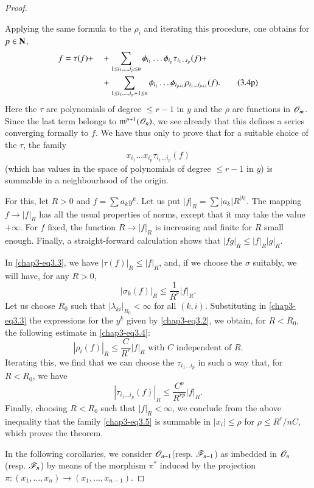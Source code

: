 \begin{proof}
\begin{itemize}
Applying the same formula to the $\rho_{i}$ and iterating this procedure, one obtains for $p\in \mathbf{N}$,
\begin{align*}
f=\tau(f) +\quad & + \sum\limits\limits_{1\leq i_{1},\ldots,i_{p}\leq n}\phi_{i_{1}}\ldots \phi_{i_{p}}\tau_{i_{1}\ldots i_{p}}(f)+\\
&+ \sum\limits_{1\leq i_{1},\ldots,i_{p}+1\leq n}\phi_{i_{1}}\ldots \phi_{i_{p+1}}\rho_{i_{1}\ldots i_{p+1}}(f).\tag{3.4p}\label{chap3-eq3.4p}
\end{align*}
Here the $\tau$ are polynomials of degree $\leq r-1$ in $y$ and the $\rho$ are functions in $\mathscr{O}_{m}$. Since the last term belongs to $\mathfrak{m}^{p+1}(\mathscr{O}_{n})$, we see already that this defines a series converging formally to $f$. We have thus only to prove that for a suitable choice of the $\tau$, the family
\begin{equation}
x_{i_{1}}\ldots x_{i_{p}}\tau_{i_{1}\ldots i_{p}}(f)\label{chap3-eq3.5}
\end{equation}
(which has values in the space of polynomials of degree $\leq r-1$ in $y$) is summable in a neighbourhood of the origin.
\end{itemize}

For this, let $R>0$ and $f=\sum a_{k}y^{k}$. Let us put $|f|_{R}=\sum | a_{k} |R^{|k|}$. The mapping $f\to |f|_{R}$ has all the usual properties of norms, except that it may take the value $+\infty$. For $f$ fixed, the function $R\to |f|_{R}$ is increasing and finite for $R$ small enough. Finally, a straight-forward calculation shows that $|fg|_{R}\leq |f|_{R}|g|_{R}$.

In \eqref{chap3-eq3.3}, we have $|\tau (f)|_{R}\leq |f|_{R}$, and, if we choose the $\sigma$ suitably, we will have, for any $R>0$,
$$
|\sigma_{k}(f)|_{R}\leq \dfrac{1}{R^{r}}|f|_{R}.
$$
Let us choose $R_{0}$ such that $|\lambda_{ki}|_{R_{0}}<\infty$ for all $(k,i)$. Substituting in \eqref{chap3-eq3.3} the expressions for the $y^{k}$ given by \eqref{chap3-eq3.2}, we obtain, for $R<R_{0}$, the following estimate in \eqref{chap3-eq3.4}:
$$
|\rho_{i}(f)|_{R}\leq \dfrac{C}{R^{r}}|f|_{R}\text{ with $C$ independent of $R$.}
$$\pageoriginale
Iterating this, we find that we can choose the $\tau_{i_{1}\ldots i_{p}}$ in such a way that, for $R<R_{0}$, we have
$$
|\tau_{i_{1}\ldots i_{p}}(f)|_{R}\leq \dfrac{C^{p}}{R^{rp}}|f|_{R}.
$$
Finally, choosing $R<R_{0}$ such that $|f|_{R}<\infty$, we conclude from the above inequality that the family \eqref{chap3-eq3.5} is summable in $|x_{i}|\leq \rho$ for $\rho\leq R^{r}/nC$, which proves the theorem.

In the following corollaries, we consider $\mathscr{O}_{n-1}$(resp. $\mathscr{F}_{n-1}$) as imbedded in $\mathscr{O}_{n}$ (resp. $\mathscr{F}_{n}$) by means of the morphism $\pi^{*}$ induced by the projection $\pi:(x_{1},\ldots,x_{n})\to (x_{1},\ldots,x_{n-1})$.
\end{proof}

